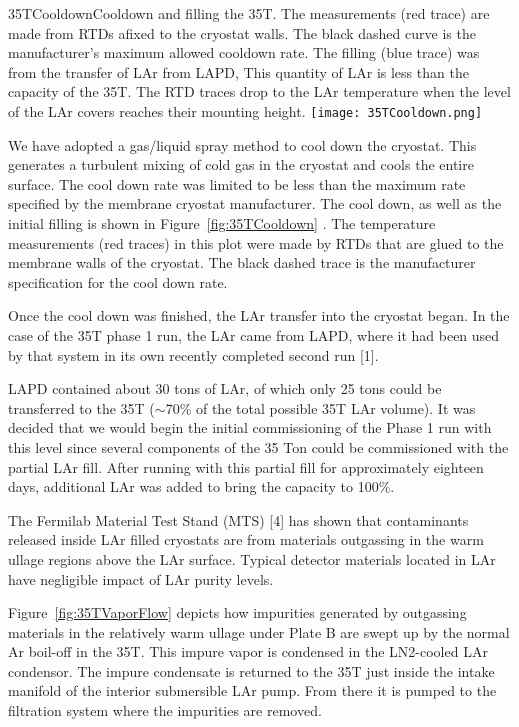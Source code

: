 
\begin{cdrfigure}{35TCooldown}{Cooldown and filling the 35T. The 
measurements (red trace) are made from RTDs afixed to the cryostat walls. The black dashed curve is the 
manufacturer's maximum allowed cooldown rate. The filling (blue trace) was from the transfer of LAr 
from LAPD, This quantity of LAr is less than the capacity of the 35T. The RTD traces drop to the LAr 
temperature when the level of the LAr covers reaches their mounting height.}
  \texttt{[image: 35TCooldown.png]}
\end{cdrfigure}

We have adopted a gas/liquid spray method to cool down the cryostat. This generates a turbulent mixing 
of cold gas in the cryostat and cools the entire surface. The cool down rate was limited to be less than 
the maximum rate specified by the membrane cryostat manufacturer. The cool down, as well as the initial 
filling is shown in Figure~\ref{fig:35TCooldown} . The temperature measurements (red traces) in this plot 
were made by RTDs that are glued to the membrane walls of the cryostat. The black dashed trace is the 
manufacturer specification for the cool down rate.

Once the cool down was finished, the LAr transfer into the cryostat began. In the case of the 35T phase 1 
run, the LAr came from LAPD, where it had been used by that system in its own recently completed 
second run [1]\fixme{}. 

LAPD contained about 30 tons of LAr, of which only 25 tons could be transferred to the 35T ($\sim$70\% of 
the total possible 35T LAr volume). It was decided that we would begin the initial commissioning of the 
Phase 1 run with this level since several components of the 35 Ton could be commissioned with the 
partial LAr fill. After running with this partial fill for approximately eighteen days, additional LAr was 
added to bring the capacity to 100\%. 


The Fermilab Material Test Stand (MTS) [4]\fixme{} has shown that contaminants released inside LAr filled cryostats are from materials outgassing in the warm ullage regions above the LAr surface. Typical detector materials located in LAr have negligible impact of LAr purity levels. 

Figure~\ref{fig:35TVaporFlow} depicts how impurities generated by outgassing materials in the 
relatively warm ullage under Plate B are swept up by the normal Ar boil-off in the 35T. This impure vapor 
is condensed in the LN2-cooled LAr condensor. The impure condensate is returned to the 35T just inside 
the intake manifold of the interior submersible LAr pump. From there it is pumped to the filtration 
system where the impurities are removed.

